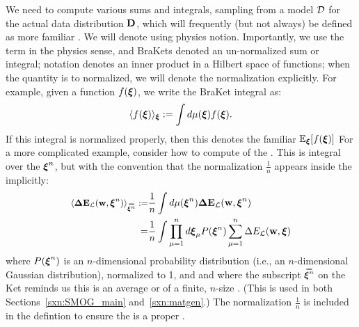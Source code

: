 We need to compute various sums and integrals, 
sampling from a model $\mathcal{D}$ for the actual data distribution $\mathbf{D}$,
which will frequently (but not always) be defined as more familiar \ExpectedValues.
We will denote \ExpectedValues using physics \BraKet notion.
Importantly, we use the term \ExpectedValue in the physics sense, and BraKets denoted an un-normalized sum or integral;
notation denotes an inner product in a Hilbert space of functions;
when the quantity is  to normalized, we will denote the normalization explicitly.
For example, given a function $f(\boldsymbol{\xi})$, 
we write the BraKet integral as:
\begin{align}
 \label{eqn:EuT}
 \langle f(\boldsymbol{\xi}) \rangle_{\boldsymbol{\xi}}:=\int d\mu(\boldsymbol{\xi}) f(\boldsymbol{\xi})  .
\end{align}
If  this integral is normalized properly, then this denotes the familiar \ExpectedValue $\mathbb{E}_{\boldsymbol{\xi}}[f(\boldsymbol{\xi})]$
For a more complicated example, consider how to compute \ExpectedValue of the \DataSampleError.
This is integral over the \ModelData $\boldsymbol{\xi}^{n}$, but with the convention that the normalization $\tfrac{1}{n}$
appears inside the \BraKet implicitly:
\begin{align}
  \label{eqn:average_data_sample_error}
\nonumber
  \langle \DETOPXI\rangle_{\AVGNDXIn}
  :=  &\frac{1}{n}\int d\mu(\NDXIn) \DETOPXI \\ 
  = &
  \frac{1}{n}\int \prod_{\mu=1}^{n}d\XI_{\mu}P(\NDXIn) \sum_{\mu=1}^{n}\DET
\end{align}
where $P(\boldsymbol{\xi}^{n})$ is an $n$-dimensional
probability distribution (i.e., an $n$-dimensional Gaussian distribution), normalized to 1, and
and where the subscript $\AVGNDXIn$ on the Ket reminds us this is an average or \ExpectedValue of a finite, $n$-size \ModelSample.
(This is used in both Sections~\ref{sxn:SMOG_main} and~\ref{sxn:matgen}.)
The normalization $\tfrac{1}{n}$ is included in the defintion to ensure the \BraKet is a proper \ExpectedValue.
